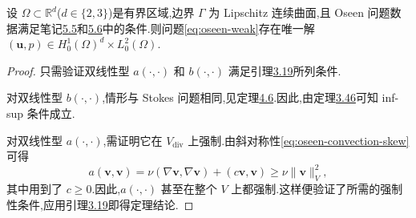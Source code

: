 \begin{theorem}\label{thm:oseen-weak-existence-uniqueness}
设 $\Omega\subset\mathbb{R}^d$($d\in\{2,3\}$)是有界区域,边界 $\Gamma$ 为 Lipschitz 连续曲面,且 Oseen 问题数据满足笔记\hyperref[note:oseen-minimal-regularity]{5.5}和\hyperref[note:oseen-skew-symmetry]{5.6}中的条件.则问题\cref{eq:oseen-weak}存在唯一解 $(\bm{u},p)\in H_0^1(\Omega)^d\times L_0^2(\Omega)$.
\end{theorem}
\begin{proof}
只需验证双线性型 $a(\cdot,\cdot)$ 和 $b(\cdot,\cdot)$ 满足引理\hyperref[lem:sufficient-condition-ellipticity]{3.19}所列条件.

对双线性型 $b(\cdot,\cdot)$,情形与 Stokes 问题相同,见定理\hyperref[thm:stokes-4-6]{4.6}.因此,由定理\hyperref[thm:infsup-v-q]{3.46}可知 inf-sup 条件成立.

对双线性型 $a(\cdot,\cdot)$,需证明它在 $V_{\mathrm{div}}$ 上强制.由斜对称性\cref{eq:oseen-convection-skew}可得
\[
  a(\bm{v},\bm{v})
  =\nu(\nabla\bm{v},\nabla\bm{v})+(c\bm{v},\bm{v})
  \ge\nu\|\bm{v}\|_V^2,
\]
其中用到了 $c\ge0$.因此,$a(\cdot,\cdot)$ 甚至在整个 $V$ 上都强制.这样便验证了所需的强制性条件,应用引理\hyperref[lem:sufficient-condition-ellipticity]{3.19}即得定理结论.
\end{proof}

